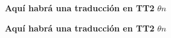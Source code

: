 \documentclass[12pt]{article}
\begin{document}
\textbf{Aquí habrá una traducción en TT2} $\theta{n}$

\textbf{Aquí habrá una traducción en TT2} $\theta{n}$
\end{document}
